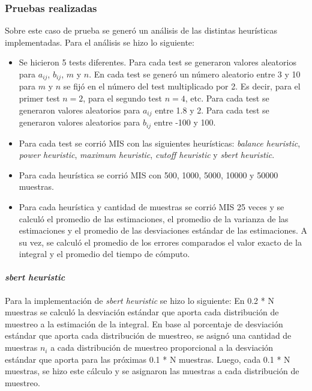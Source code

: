 \documentclass{article}
\begin{document}
\subsubsection{Pruebas realizadas}

Sobre este caso de prueba se generó un análisis de las distintas heurísticas implementadas.
Para el análisis se hizo lo siguiente:
\begin{itemize}
    \item Se hicieron 5 tests diferentes. Para cada test se generaron valores aleatorios para \( a_{ij} \), \( b_{ij} \), \( m \) y \( n \).
          En cada test se generó un número aleatorio entre 3 y 10 para \( m \) y \( n \) se fijó en el número del test multiplicado por 2.
          Es decir, para el primer test \( n = 2 \), para el segundo test \( n = 4 \), etc.
          Para cada test se generaron valores aleatorios para \( a_{ij} \) entre 1.8 y 2.
          Para cada test se generaron valores aleatorios para \( b_{ij} \) entre -100 y 100.
    \item Para cada test se corrió MIS con las siguientes heurísticas: \textit{balance heuristic}, \textit{power heuristic}, \textit{maximum heuristic}, \textit{cutoff heuristic} y \textit{sbert heuristic}.
    \item Para cada heurística se corrió MIS con 500, 1000, 5000, 10000 y 50000 muestras.
    \item Para cada heurística y cantidad de muestras se corrió MIS 25 veces y se calculó el promedio de las estimaciones,
          el promedio de la varianza de las estimaciones y el promedio de las desviaciones estándar de las estimaciones.
          A su vez, se calculó el promedio de los errores comparados el valor exacto de la integral y el promedio del tiempo de cómputo.
\end{itemize}

\paragraph{\textit{sbert heuristic}}
Para la implementación de \textit{sbert heuristic} se hizo lo siguiente:
En 0.2 * N muestras se calculó la desviación estándar que aporta cada distribución de muestreo a la estimación de la integral.
En base al porcentaje de desviación estándar que aporta cada distribución de muestreo, se asignó una cantidad de muestras $n_i$ a cada distribución de muestreo proporcional a la desviación estándar que aporta para las próximas 0.1 * N muestras.
Luego, cada 0.1 * N muestras, se hizo este cálculo y se asignaron las muestras a cada distribución de muestreo.
\end{document}

